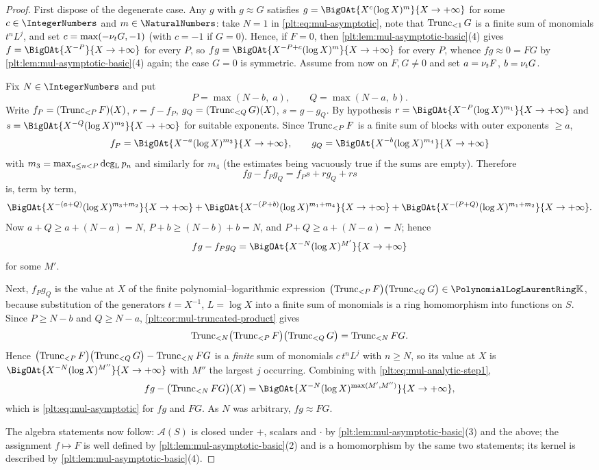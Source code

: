 \begin{proof}
First dispose of the degenerate case.  Any $g$ with $g\approx G$ satisfies
$g=\BigOAt{X^{c}(\log X)^{m}}{X\to+\infty}$ for some $c\in\IntegerNumbers$
and $m\in\NaturalNumbers$: take $N=1$ in \eqref{plt:eq:mul-asymptotic}, note
that $\Trunc{G}{1}$ is a finite sum of monomials $t^nL^j$, and set
$c=\max(-\ordt G,-1)$ (with $c=-1$ if $G=0$).  Hence, if $F=0$, then
\cref{plt:lem:mul-asymptotic-basic}(4) gives
$f=\BigOAt{X^{-P}}{X\to+\infty}$ for every $P$, so
$fg=\BigOAt{X^{-P+c}(\log X)^{m}}{X\to+\infty}$ for every $P$, whence
$fg\approx0=FG$ by \cref{plt:lem:mul-asymptotic-basic}(4) again; the case
$G=0$ is symmetric.  Assume from now on $F,G\ne0$ and set $a=\ordt F$,
$b=\ordt G$.

Fix $N\in\IntegerNumbers$ and put
\[
 P=\max(N-b,\;a),
 \qquad
 Q=\max(N-a,\;b).
\]
Write $f_P=(\Trunc{F}{P})(X)$, $r=f-f_P$, $g_Q=(\Trunc{G}{Q})(X)$,
$s=g-g_Q$.  By hypothesis
$r=\BigOAt{X^{-P}(\log X)^{m_1}}{X\to+\infty}$ and
$s=\BigOAt{X^{-Q}(\log X)^{m_2}}{X\to+\infty}$ for suitable exponents.  Since
$\Trunc{F}{P}$ is a finite sum of blocks with outer exponents $\ge a$,
\[
 f_P=\BigOAt{X^{-a}(\log X)^{m_3}}{X\to+\infty},
 \qquad
 g_Q=\BigOAt{X^{-b}(\log X)^{m_4}}{X\to+\infty}
\]
with $m_3=\max_{a\le n<P}\degL p_n$ and similarly for $m_4$ (the estimates
being vacuously true if the sums are empty).  Therefore
\[
 fg-f_Pg_Q=f_Ps+rg_Q+rs
\]
is, term by term,
\[
 \BigOAt{X^{-(a+Q)}(\log X)^{m_3+m_2}}{X\to+\infty}
 +\BigOAt{X^{-(P+b)}(\log X)^{m_1+m_4}}{X\to+\infty}
 +\BigOAt{X^{-(P+Q)}(\log X)^{m_1+m_2}}{X\to+\infty}.
\]
Now $a+Q\ge a+(N-a)=N$, $P+b\ge(N-b)+b=N$, and $P+Q\ge a+(N-a)=N$; hence
\begin{equation}\label{plt:eq:mul-analytic-step1}
 fg-f_Pg_Q=\BigOAt{X^{-N}(\log X)^{M'}}{X\to+\infty}
\end{equation}
for some $M'$.

Next, $f_Pg_Q$ is the value at $X$ of the finite polynomial--logarithmic
expression $\bigl(\Trunc{F}{P}\bigr)\bigl(\Trunc{G}{Q}\bigr)\in\PLlau$,
because substitution of the generators $t=X^{-1}$, $L=\log X$ into a finite
sum of monomials is a ring homomorphism into functions on $S$.  Since
$P\ge N-b$ and $Q\ge N-a$, \cref{plt:cor:mul-truncated-product} gives
\[
 \Trunc{\bigl(\Trunc{F}{P}\bigr)\bigl(\Trunc{G}{Q}\bigr)}{N}
 =\Trunc{FG}{N}.
\]
Hence $\bigl(\Trunc{F}{P}\bigr)\bigl(\Trunc{G}{Q}\bigr)-\Trunc{FG}{N}$ is a
\emph{finite} sum of monomials $c\,t^nL^j$ with $n\ge N$, so its value at
$X$ is $\BigOAt{X^{-N}(\log X)^{M''}}{X\to+\infty}$ with $M''$ the largest
$j$ occurring.  Combining with \eqref{plt:eq:mul-analytic-step1},
\[
 fg-\bigl(\Trunc{FG}{N}\bigr)(X)
 =\BigOAt{X^{-N}(\log X)^{\max(M',M'')}}{X\to+\infty},
\]
which is \eqref{plt:eq:mul-asymptotic} for $fg$ and $FG$.  As $N$ was
arbitrary, $fg\approx FG$.

The algebra statements now follow: $\mathcal A(S)$ is closed under $+$,
scalars and $\cdot$ by \cref{plt:lem:mul-asymptotic-basic}(3) and the above;
the assignment $f\mapsto F$ is well defined by
\cref{plt:lem:mul-asymptotic-basic}(2) and is a homomorphism by the same two
statements; its kernel is described by
\cref{plt:lem:mul-asymptotic-basic}(4).
\end{proof}

